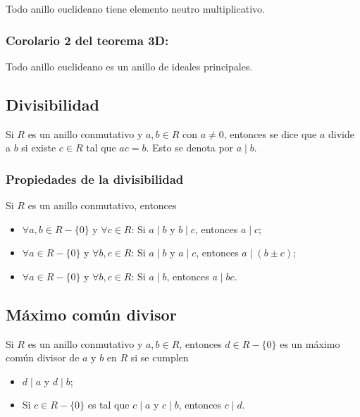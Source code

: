 \documentclass{article}
\begin{document}
Todo anillo euclideano tiene elemento neutro multiplicativo.

\subsubsection*{\color{red} Corolario 2 del teorema 3D:}

Todo anillo euclideano es un anillo de ideales principales.

\subsection*{\color{violet} Divisibilidad}

Si $R$ es un anillo conmutativo y $a,b\in R$ con $a\neq0$, entonces se dice que $a$ divide a $b$ si existe $c\in R$ tal que $ac=b$. Esto se denota por $a\mid b$.

\subsubsection*{\color{teal} Propiedades de la divisibilidad}

Si $R$ es un anillo conmutativo, entonces

\begin{itemize}

\item $\forall a,b\in R-\{0\}$ y $\forall c\in R$: Si $a\mid b$ y $b\mid c$, entonces $a\mid c$;

\item  $\forall a\in R-\{0\}$ y $\forall b,c\in R$: Si $a\mid b$ y $a\mid c$, entonces $a\mid (b\pm c)$;

\item $\forall a\in R-\{0\}$ y $\forall b,c\in R$: Si $a\mid b$, entonces $a\mid bc$.

\end{itemize}

\subsection*{\color{violet} Máximo común divisor}

Si $R$ es un anillo conmutativo y $a,b\in R$, entonces $d\in R-\{0\}$ es un máximo común divisor de $a$ y $b$ en $R$ si se cumplen

\begin{itemize}

\item $d\mid a$ y $d\mid b$;

\item Si $c\in R-\{0\}$ es tal que $c\mid a$ y $c\mid b$, entonces $c\mid d$.

\end{itemize}
\end{document}
